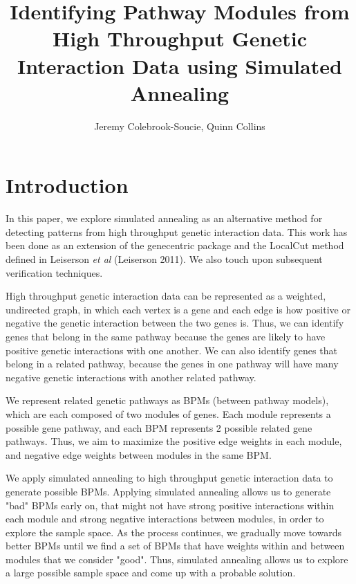 \documentclass[11pt]{article}
\title{Identifying Pathway Modules from High Throughput Genetic Interaction Data using Simulated Annealing}
\author{Jeremy Colebrook-Soucie, Quinn Collins}
\begin{document}
\maketitle




\section{Introduction}

\par In this paper, we explore simulated annealing as an alternative method for detecting patterns from high throughput genetic interaction data. This work has been done as an extension of the genecentric package and the LocalCut method defined in Leiserson \textit{et al} (Leiserson 2011). We also touch upon subsequent verification techniques.

\par High throughput genetic interaction data can be represented as a weighted, undirected graph, in which each vertex is a gene and each edge is how positive or negative the genetic interaction between the two genes is. Thus, we can identify genes that belong in the same pathway because the genes are likely to have positive genetic interactions with one another. We can also identify genes that belong in a related pathway, because the genes in one pathway will have many negative genetic interactions with another related pathway.  

\par We represent related genetic pathways as BPMs (between pathway models), which are each composed of two modules of genes. Each module represents a possible gene pathway, and each BPM represents 2 possible related gene pathways. Thus, we aim to maximize the positive edge weights in each module, and negative edge weights between modules in the same BPM. 

\par We apply simulated annealing to high throughput genetic interaction data to generate possible BPMs. Applying simulated annealing allows us to generate "bad" BPMs early on, that might not have strong positive interactions within each module and strong negative interactions between modules, in order to explore the sample space. As the process continues, we gradually move towards better BPMs until we find a set of BPMs that have weights within and between modules that we consider "good". Thus, simulated annealing allows us to explore a large possible sample space and come up with a probable solution. 
\end{document}
